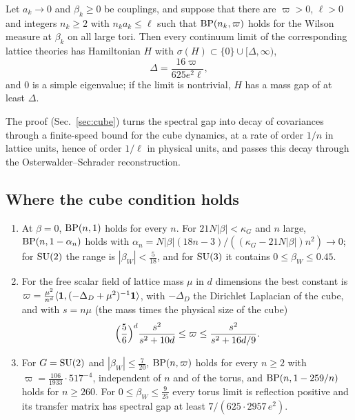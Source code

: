 \begin{mainthm}\label{thm:B}
Let $a_k\to0$ and $\beta_k\ge0$ be couplings, and suppose that there are
$\varpi>0$, $\ell>0$ and integers $n_k\ge2$ with $n_ka_k\le\ell$ such that
$\mathrm{BP}(n_k,\varpi)$ holds for the Wilson measure at $\beta_k$ on all large tori.
Then every continuum limit of the corresponding lattice theories has
Hamiltonian $H$ with $\sigma(H)\subset\{0\}\cup[\Delta,\infty)$,
\[
\Delta=\frac{16\varpi}{625e^2\ell},
\]
and $0$ is a simple eigenvalue; if the limit is nontrivial, $H$ has a mass
gap of at least $\Delta$.
\end{mainthm}

The proof (Sec.~\ref{sec:cube}) turns the spectral gap into decay of
covariances through a finite-speed bound for the cube dynamics, at a rate
of order $1/n$ in lattice units, hence of order $1/\ell$ in physical units,
and passes this decay through the Osterwalder--Schrader reconstruction.

\subsection{Where the cube condition holds}

\begin{mainthm}\label{thm:C}
\begin{enumerate}[label=\textup{(\roman*)},leftmargin=*]
\item At $\beta=0$, $\mathrm{BP}(n,1)$ holds for every $n$. For
$21N|\beta|<\kappa_G$ and $n$ large, $\mathrm{BP}(n,1-\alpha_n)$ holds with
$\alpha_n=N|\beta|(18n-3)/((\kappa_G-21N|\beta|)n^2)\to0$; for $\mathrm{SU}(2)$ the
range is $|\beta_W|<\frac5{18}$, and for $\mathrm{SU}(3)$ it contains
$0\le\beta_W\le0.45$.
\item For the free scalar field of lattice mass $\mu$ in $d$ dimensions the
best constant is
$\varpi=\frac{\mu^2}{n^d}\langle \mathbf 1,(-\Delta_D+\mu^2)^{-1}\mathbf 1\rangle$, with
$-\Delta_D$ the Dirichlet Laplacian of the cube, and with $s=n\mu$ (the mass
times the physical size of the cube)
\[
\Bigl(\frac56\Bigr)^d\frac{s^2}{s^2+10d}\le\varpi\le\frac{s^2}{s^2+16d/9}.
\]
\item For $G=\mathrm{SU}(2)$ and $|\beta_W|\le\frac7{20}$, $\mathrm{BP}(n,\varpi)$ holds for
every $n\ge2$ with $\varpi=\frac{106}{1933}\cdot517^{-4}$, independent of $n$
and of the torus, and $\mathrm{BP}(n,1-259/n)$ holds for $n\ge260$. For
$0\le\beta_W\le\frac9{25}$ every torus limit is reflection positive and its
transfer matrix has spectral gap at least $7/(625\cdot2957\,e^2)$.
\end{enumerate}
\end{mainthm}

